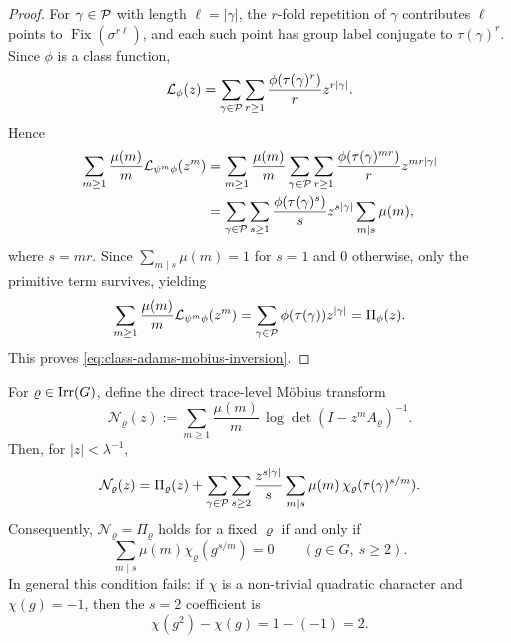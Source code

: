 \begin{proof}
  For \(\gamma\in\mathcal P\) with length \(\ell=|\gamma|\), the \(r\)-fold
  repetition of \(\gamma\) contributes \(\ell\) points to
  \(\operatorname{Fix}(\sigma^{r\ell})\), and each such point has group
  label conjugate to \(\tau(\gamma)^r\). Since \(\phi\) is a class
  function,
  \[
    \mathcal L_\phi(z)
    =
    \sum_{\gamma\in\mathcal P}\sum_{r\ge 1}
      \frac{\phi(\tau(\gamma)^r)}{r}z^{r|\gamma|}.
  \]
  Hence
  \begin{align*}
    \sum_{m\ge 1}\frac{\mu(m)}{m}\mathcal L_{\psi^m\phi}(z^m)
    &=
    \sum_{m\ge 1}\frac{\mu(m)}{m}
      \sum_{\gamma\in\mathcal P}\sum_{r\ge 1}
        \frac{\phi(\tau(\gamma)^{mr})}{r}z^{mr|\gamma|} \\
    &=
    \sum_{\gamma\in\mathcal P}\sum_{s\ge 1}
      \frac{\phi(\tau(\gamma)^s)}{s}z^{s|\gamma|}
      \sum_{m\mid s}\mu(m),
  \end{align*}
  where \(s=mr\). Since \(\sum_{m\mid s}\mu(m)=1\) for \(s=1\) and
  \(0\) otherwise, only the primitive term survives, yielding
  \[
    \sum_{m\ge 1}\frac{\mu(m)}{m}\mathcal L_{\psi^m\phi}(z^m)
    =
    \sum_{\gamma\in\mathcal P}\phi(\tau(\gamma))z^{|\gamma|}
    =\Pi_\phi(z).
  \]
  This proves \eqref{eq:class-adams-mobius-inversion}.
\end{proof}

\begin{proposition}
  \label{prop:naive-mobius-contamination}
  For \(\varrho\in\operatorname{Irr}(G)\), define the direct trace-level M\"obius
  transform
  \[
    \mathcal N_\varrho(z)
    :=\sum_{m\ge 1}\frac{\mu(m)}{m}\,
      \log\det(I-z^mA_\varrho)^{-1}.
  \]
  Then, for \(|z|<\lambda^{-1}\),
  \[
    \mathcal N_\varrho(z)
    =
    \Pi_\varrho(z)
    +\sum_{\gamma\in\mathcal P}\sum_{s\ge 2}\frac{z^{s|\gamma|}}{s}
      \sum_{m\mid s}\mu(m)\,
        \chi_\varrho(\tau(\gamma)^{s/m}).
  \]
  Consequently, \(\mathcal N_\varrho=\Pi_\varrho\) holds for a fixed
  \(\varrho\) if and only if
  \[
    \sum_{m\mid s}\mu(m)\chi_\varrho(g^{s/m})=0
    \qquad
    (g\in G,\ s\ge 2).
  \]
  In general this condition fails: if \(\chi\) is a non-trivial
  quadratic character and \(\chi(g)=-1\), then the \(s=2\) coefficient
  is
  \[
    \chi(g^2)-\chi(g)=1-(-1)=2.
  \]
\end{proposition}

